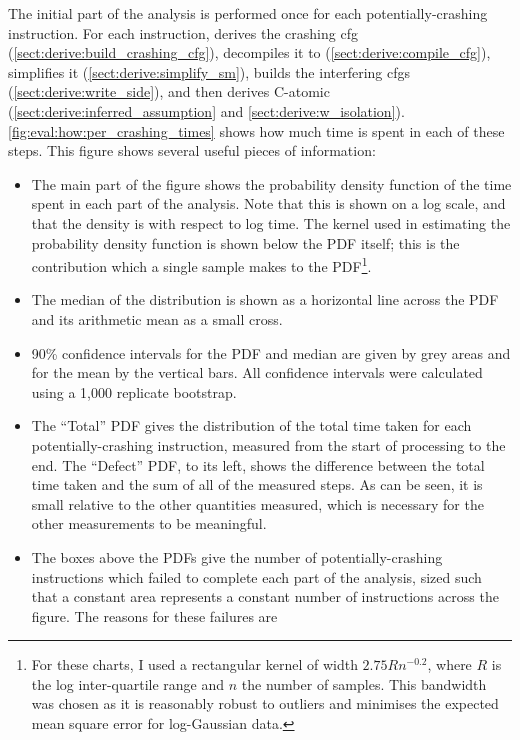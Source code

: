 \noindent
The initial part of the analysis is performed once for each
potentially-crashing instruction.  For each instruction, {\technique}
derives the crashing \gls{cfg}
(\autoref{sect:derive:build_crashing_cfg}), decompiles it to
{\AStateMachine} (\autoref{sect:derive:compile_cfg}), simplifies it
(\autoref{sect:derive:simplify_sm}), builds the interfering
\glspl{cfg} (\autoref{sect:derive:write_side}), and then derives
C-atomic (\autoref{sect:derive:inferred_assumption} and
\autoref{sect:derive:w_isolation}).
\autoref{fig:eval:how:per_crashing_times} shows how much time is spent
in each of these steps.  This figure shows several useful pieces of
information:
\begin{itemize}
\item The main part of the figure shows the probability density
  function of the time spent in each part of the analysis.  Note that
  this is shown on a log scale, and that the density is with respect
  to log time.  The kernel used in estimating the probability density
  function is shown below the PDF itself; this is the contribution
  which a single sample makes to the PDF\footnote{For these charts, I
    used a rectangular kernel of width $2.75Rn^{-0.2}$, where $R$ is
    the log inter-quartile range and $n$ the number of samples.  This
    bandwidth was chosen as it is reasonably robust to outliers and
    minimises the expected mean square error for log-Gaussian
    data.}\!\!.
\item The median of the distribution is shown as a horizontal line
  across the PDF and its arithmetic mean as a small cross.
\item 90\% confidence intervals for the PDF and median are given by
  grey areas and for the mean by the vertical bars.  All confidence
  intervals were calculated using a 1,000 replicate bootstrap.
\item The ``Total'' PDF gives the distribution of the total time taken
  for each potentially-crashing instruction, measured from the start
  of processing to the end.  The ``Defect'' PDF, to its left, shows
  the difference between the total time taken and the sum of all of
  the measured steps.  As can be seen, it is small relative to the
  other quantities measured, which is necessary for the other
  measurements to be meaningful.
\item The boxes above the PDFs give the number of potentially-crashing
  instructions which failed to complete each part of the analysis,
  sized such that a constant area represents a constant number of
  instructions across the figure.  The reasons for these failures are

\end{itemize}
